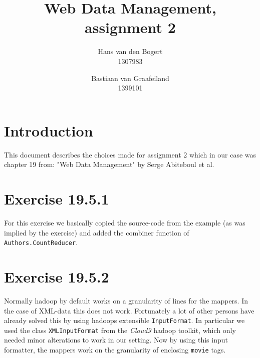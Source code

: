 \documentclass{article}
\title{Web Data Management, assignment 2}
\author{Hans van den Bogert\\1307983 \and Bastiaan van Graafeiland\\1399101}
\begin{document}
\maketitle

\section{Introduction}
This document describes the choices made for assignment 2 which in our
case was chapter 19 from: "Web Data Management" by Serge
Abiteboul et al.

\section{Exercise 19.5.1 }
For this exercise we basically copied the source-code from the example
(as was implied by the exercise) and added the combiner function of
\texttt{Authors.CountReducer}.

\section{Exercise 19.5.2}
Normally hadoop by default works on a granularity of lines for the
mappers. In the case of XML-data this does not work. Fortunately a lot
of other persons have already solved this by using hadoops extensible
\texttt{InputFormat}. In particular we used the class
\texttt{XMLInputFormat} from the \emph{Cloud9} hadoop toolkit, which
only needed minor alterations to work in our setting. Now by using
this input formatter, the mappers work on the granularity of enclosing
\texttt{movie} tags. 
\end{document}
